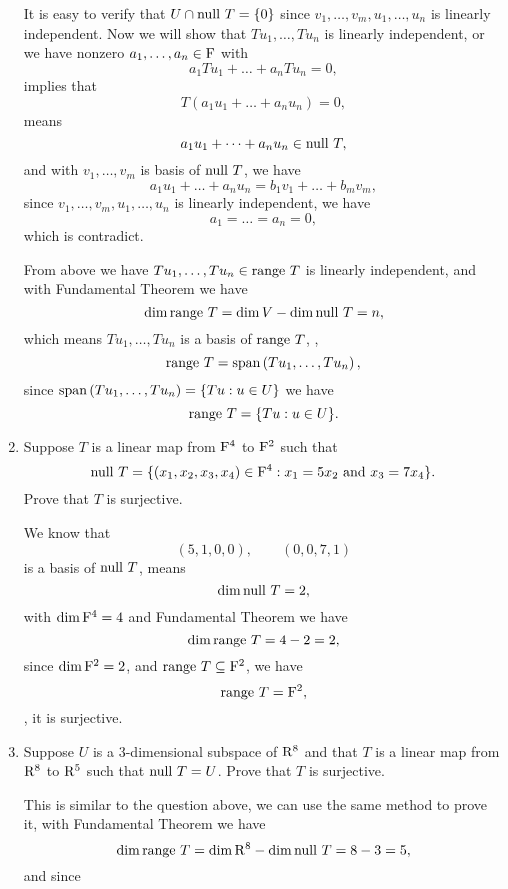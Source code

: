 \begin{enumerate}
\begin{solution}
            It is easy to verify that $U \cap \text{null}~T = \{0\}$ since $v_1, \ldots, v_m, u_1, \ldots, u_n$ is linearly independent.
            Now we will show that $Tu_1, \ldots, Tu_n$ is linearly independent, or we have nonzero $a_1, \ldots, a_n \in \mathrm{F}$ with 
            \[ a_1Tu_1 + \dots + a_nTu_n = 0,\]
            implies that 
            \[ T(a_1u_1 + \dots + a_nu_n) = 0, \]
            means 
            \[ a_1u_1 + \dots + a_nu_n \in \text{null}~T, \]
            and with $v_1, \ldots, v_m$ is basis of $\text{null}~T$, we have 
            \[ a_1u_1 + \dots + a_nu_n = b_1v_1 + \dots + b_mv_m, \]
            since $v_1, \ldots, v_m, u_1, \ldots, u_n$ is linearly independent, we have 
            \[ a_1 = \dots = a_n = 0,\]
            which is contradict.

            From above we have $Tu_1, \ldots, Tu_n \in \text{range}~T$ is linearly independent, and with Fundamental Theorem we have 
            \[ \dim{\text{range}~T} = \dim{V} - \dim{\text{null}~T} = n, \]
            which means $Tu_1, \ldots, Tu_n$ is a basis of $\text{range}~T$, \ie, 
            \[ \text{range}~T = \text{span}\left(Tu_1, \ldots, Tu_n\right), \]
            since $\text{span}\left(Tu_1, \ldots, Tu_n\right) = \{Tu: u \in U\}$ we have 
            \[ \text{range}~T = \{Tu: u \in U\} .\]
        \end{solution}
    \item Suppose $T$ is a linear map from $\mathrm{F}^4$ to $\mathrm{F}^2$ such that
        \[ \text{null}~T = \{(x_1,x_2,x_3,x_4) \in \mathrm{F}^4: x_1=5x_2 \text{ and } x_3 = 7x_4 \}. \]
        Prove that $T$ is surjective.
        \begin{solution}
            We know that 
            \[ (5,1,0,0), \qquad (0,0,7,1)\]
            is a basis of $\text{null}~T$, means 
            \[ \dim{\text{null}~T} = 2, \]
            with $\dim{\mathrm{F}^4} = 4$ and Fundamental Theorem we have 
            \[ \dim{\text{range}~T} = 4 - 2 = 2,\]
            since $\dim{\mathrm{F}^2}=2$, and $\text{range}~T \subseteq \mathrm{F}^2$, we have 
            \[ \text{range}~T = \mathrm{F}^2, \]
            \ie, it is surjective.
        \end{solution}
    \item Suppose $U$ is a $3$-dimensional subspace of $\mathrm{R}^8$ and that $T$ is a linear map from $\mathrm{R}^8$ to $\mathrm{R}^5$
        such that $\text{null}~T = U$. Prove that $T$ is surjective.
        \begin{solution}
            This is similar to the question above, we can use the same method to prove it, with Fundamental Theorem we have 
            \[ \dim{\text{range}~T} = \dim{\mathrm{R}^8} - \dim{\text{null}~T} = 8 - 3 = 5, \]
            and since 

\end{solution}
\end{enumerate}
